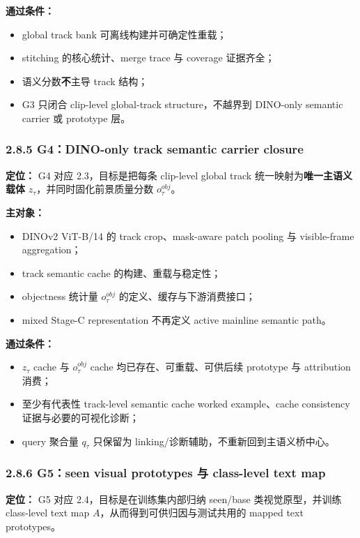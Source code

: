 \documentclass[UTF8]{ctexart}
\begin{document}
\textbf{通过条件：}
\begin{itemize}
\item global track bank 可离线构建并可确定性重载；
\item stitching 的核心统计、merge trace 与 coverage 证据齐全；
\item 语义分数\textbf{不}主导 track 结构；
\item G3 只闭合 clip-level global-track structure，不越界到 DINO-only semantic carrier 或 prototype 层。
\end{itemize}

\subsubsection*{2.8.5 G4：DINO-only track semantic carrier closure}
\textbf{定位：} G4 对应 2.3，目标是把每条 clip-level global track 统一映射为\textbf{唯一主语义载体} $z_\tau$，并同时固化前景质量分数 $o_\tau^{obj}$。

\textbf{主对象：}
\begin{itemize}
\item DINOv2 ViT-B/14 的 track crop、mask-aware patch pooling 与 visible-frame aggregation；
\item track semantic cache 的构建、重载与稳定性；
\item objectness 统计量 $o_\tau^{obj}$ 的定义、缓存与下游消费接口；
\item mixed Stage-C representation 不再定义 active mainline semantic path。
\end{itemize}

\textbf{通过条件：}
\begin{itemize}
\item $z_\tau$ cache 与 $o_\tau^{obj}$ cache 均已存在、可重载、可供后续 prototype 与 attribution 消费；
\item 至少有代表性 track-level semantic cache worked example、cache consistency 证据与必要的可视化诊断；
\item query 聚合量 $q_\tau$ 只保留为 linking/诊断辅助，不重新回到主语义桥中心。
\end{itemize}

\subsubsection*{2.8.6 G5：seen visual prototypes 与 class-level text map}
\textbf{定位：} G5 对应 2.4，目标是在训练集内部归纳 seen/base 类视觉原型，并训练 class-level text map $A$，从而得到可供归因与测试共用的 mapped text prototypes。
\end{document}
